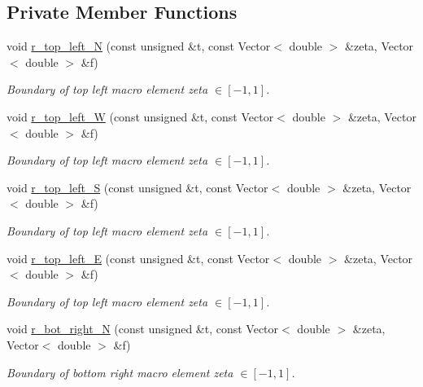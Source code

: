\subsection*{Private Member Functions}
\begin{DoxyCompactItemize}
\item 
void \hyperlink{classoomph_1_1QuarterCircleSectorDomain_af1520e712b46c8e1b0f098596fa63101}{r\+\_\+top\+\_\+left\+\_\+N} (const unsigned \&t, const Vector$<$ double $>$ \&zeta, Vector$<$ double $>$ \&f)
\begin{DoxyCompactList}\small\item\em Boundary of top left macro element zeta $ \in [-1,1] $. \end{DoxyCompactList}\item 
void \hyperlink{classoomph_1_1QuarterCircleSectorDomain_a84f4970adc3a93392ef1a57f19df96a1}{r\+\_\+top\+\_\+left\+\_\+W} (const unsigned \&t, const Vector$<$ double $>$ \&zeta, Vector$<$ double $>$ \&f)
\begin{DoxyCompactList}\small\item\em Boundary of top left macro element zeta $ \in [-1,1] $. \end{DoxyCompactList}\item 
void \hyperlink{classoomph_1_1QuarterCircleSectorDomain_a0bb74af9c782bd0a0a8d3ccfd708af55}{r\+\_\+top\+\_\+left\+\_\+S} (const unsigned \&t, const Vector$<$ double $>$ \&zeta, Vector$<$ double $>$ \&f)
\begin{DoxyCompactList}\small\item\em Boundary of top left macro element zeta $ \in [-1,1] $. \end{DoxyCompactList}\item 
void \hyperlink{classoomph_1_1QuarterCircleSectorDomain_a951bc38c7e96a40f33c60b3ccee820bf}{r\+\_\+top\+\_\+left\+\_\+E} (const unsigned \&t, const Vector$<$ double $>$ \&zeta, Vector$<$ double $>$ \&f)
\begin{DoxyCompactList}\small\item\em Boundary of top left macro element zeta $ \in [-1,1] $. \end{DoxyCompactList}\item 
void \hyperlink{classoomph_1_1QuarterCircleSectorDomain_ad937b0da664b5c01063e7f8de6427fce}{r\+\_\+bot\+\_\+right\+\_\+N} (const unsigned \&t, const Vector$<$ double $>$ \&zeta, Vector$<$ double $>$ \&f)
\begin{DoxyCompactList}\small\item\em Boundary of bottom right macro element zeta $ \in [-1,1] $. \end{DoxyCompactList}\item 

\end{DoxyCompactItemize}
